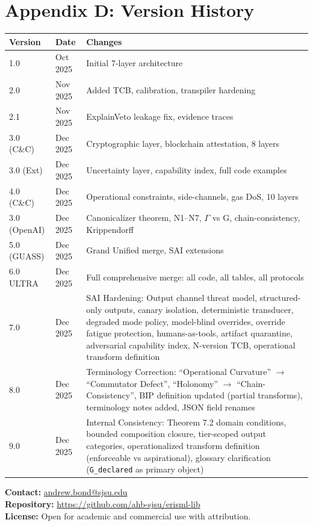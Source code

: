 \documentclass[11pt,letterpaper]{article}
\theoremstyle{definition}
\theoremstyle{remark}
\begin{document}
\section*{Appendix D: Version History}

\begin{longtable}{@{}llp{9cm}@{}}
\toprule
\textbf{Version} & \textbf{Date} & \textbf{Changes} \\
\midrule
\endhead
1.0 & Oct 2025 & Initial 7-layer architecture \\
2.0 & Nov 2025 & Added TCB, calibration, transpiler hardening \\
2.1 & Nov 2025 & ExplainVeto leakage fix, evidence traces \\
3.0 (C\&C) & Dec 2025 & Cryptographic layer, blockchain attestation, 8 layers \\
3.0 (Ext) & Dec 2025 & Uncertainty layer, capability index, full code examples \\
4.0 (C\&C) & Dec 2025 & Operational constraints, side-channels, gas DoS, 10 layers \\
3.0 (OpenAI) & Dec 2025 & Canonicalizer theorem, N1--N7, $\Gamma$ vs G, chain-consistency, Krippendorff \\
5.0 (GUASS) & Dec 2025 & Grand Unified merge, SAI extensions \\
6.0 ULTRA & Dec 2025 & Full comprehensive merge: all code, all tables, all protocols \\
7.0 & Dec 2025 & SAI Hardening: Output channel threat model, structured-only outputs, canary isolation, deterministic transducer, degraded mode policy, model-blind overrides, override fatigue protection, humans-as-tools, artifact quarantine, adversarial capability index, N-version TCB, operational transform definition \\
8.0 & Dec 2025 & Terminology Correction: ``Operational Curvature'' $\to$ ``Commutator Defect'', ``Holonomy'' $\to$ ``Chain-Consistency'', BIP definition updated (partial transforms), terminology notes added, JSON field renames \\
9.0 & Dec 2025 & Internal Consistency: Theorem 7.2 domain conditions, bounded composition closure, tier-scoped output categories, operationalized transform definition (enforceable vs aspirational), glossary clarification (\texttt{G\_declared} as primary object) \\
\bottomrule
\end{longtable}

\medskip
\noindent\textbf{Contact:} \href{mailto:andrew.bond@sjsu.edu}{andrew.bond@sjsu.edu}\\
\textbf{Repository:} \url{https://github.com/ahb-sjsu/erisml-lib}\\
\textbf{License:} Open for academic and commercial use with attribution.
\end{document}
